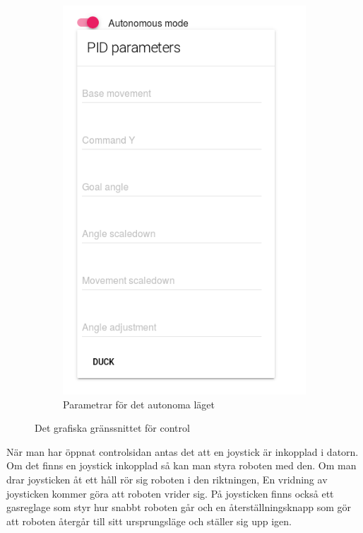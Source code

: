 \documentclass[a4paper,titlepage,12pt]{article}
\begin{document}
\begin{figure}[h]
\begin{subfigure}{.4\textwidth}
		\includegraphics[width=1\linewidth]{images/gui-parameters.png}
		\caption{Parametrar för det autonoma läget}
      \end{subfigure}
      \caption{Det grafiska gränssnittet för control\label{fig:gui-control}}
	\end{figure}
	
	När man har öppnat controlsidan antas det att en joystick är inkopplad i
    datorn. Om det finns en joystick inkopplad så kan man styra roboten med den.
    Om man drar joysticken åt ett håll rör sig roboten i den riktningen, En
    vridning av joysticken kommer göra att roboten vrider sig. På joysticken
    finns också ett gasreglage som styr hur snabbt roboten går och en
    återställningsknapp som gör att roboten återgår till sitt ursprungsläge och
    ställer sig upp igen.
\end{document}
